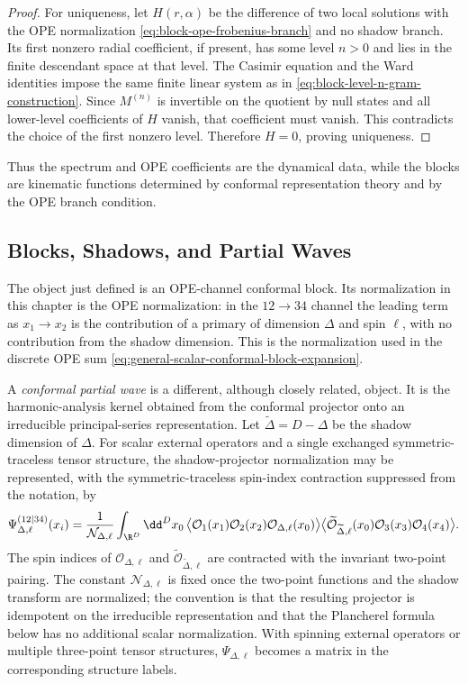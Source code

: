 \begin{proof}
For uniqueness, let \(H(r,\alpha)\) be the difference of two local solutions
with the OPE normalization \eqref{eq:block-ope-frobenius-branch} and no shadow
branch.  Its first nonzero radial coefficient, if present, has some level
\(n>0\) and lies in the finite descendant space at that level.  The Casimir
equation and the Ward identities impose the same finite linear system as in
\eqref{eq:block-level-n-gram-construction}.  Since \(M^{(n)}\) is invertible on
the quotient by null states and all lower-level coefficients of \(H\) vanish,
that coefficient must vanish.  This contradicts the choice of the first
nonzero level.  Therefore \(H=0\), proving uniqueness.
\end{proof}

Thus the spectrum and OPE coefficients are the dynamical data, while the
blocks are kinematic functions determined by conformal representation theory
and by the OPE branch condition.

\subsection{Blocks, Shadows, and Partial Waves}

The object just defined is an OPE-channel conformal block.  Its normalization
in this chapter is the OPE normalization: in the \(12\to34\) channel the
leading term as \(x_1\to x_2\) is the contribution of a primary of dimension
\(\Delta\) and spin \(\ell\), with no contribution from the shadow dimension.
This is the normalization used in the discrete OPE sum
\eqref{eq:general-scalar-conformal-block-expansion}.

A \emph{conformal partial wave} is a different, although closely related,
object.  It is the harmonic-analysis kernel obtained from the conformal
projector onto an irreducible principal-series representation.  Let
\(\widetilde\Delta=D-\Delta\) be the shadow dimension of
\(\Delta\).  For scalar external operators and a single exchanged
symmetric-traceless tensor structure, the shadow-projector normalization may
be represented, with the symmetric-traceless spin-index contraction suppressed
from the notation, by
\begin{equation}
  \Psi_{\Delta,\ell}^{(12|34)}(x_i)
  =
  \frac{1}{\mathcal N_{\Delta,\ell}}
  \int_{\R^D}\dd^D x_0\,
  \bigl\langle
    \mathcal O_1(x_1)\mathcal O_2(x_2)
    \mathcal O_{\Delta,\ell}(x_0)
  \bigr\rangle
  \bigl\langle
    \widetilde{\mathcal O}_{\widetilde\Delta,\ell}(x_0)
    \mathcal O_3(x_3)\mathcal O_4(x_4)
  \bigr\rangle .
  \label{eq:shadow-projector-partial-wave}
\end{equation}
The spin indices of
\(\mathcal O_{\Delta,\ell}\) and
\(\widetilde{\mathcal O}_{\widetilde\Delta,\ell}\) are contracted with the
invariant two-point pairing.  The constant
\(\mathcal N_{\Delta,\ell}\) is fixed once the two-point functions and the
shadow transform are normalized; the convention is that the resulting
projector is idempotent on the irreducible representation and that the
Plancherel formula below has no additional scalar normalization.  With
spinning external operators or multiple three-point tensor structures,
\(\Psi_{\Delta,\ell}\) becomes a matrix in the corresponding structure labels.

